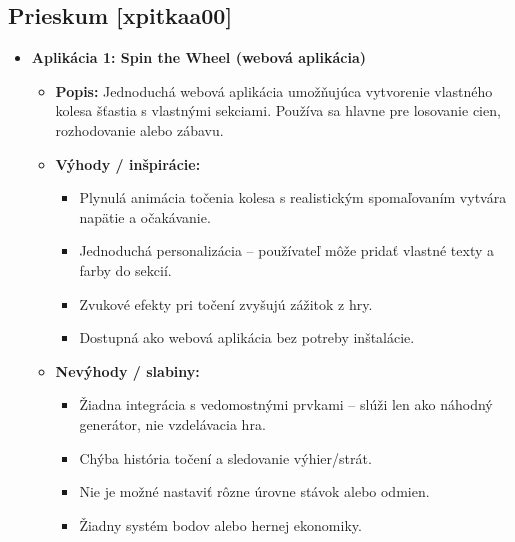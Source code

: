 \documentclass[a4paper,12pt]{article}
\begin{document}
    	
    	\subsection{Prieskum [xpitkaa00]}
    	\renewcommand{\labelitemi}{$\bullet$}
    	\renewcommand{\labelitemii}{$\bullet$}
    	\renewcommand{\labelitemiii}{$\bullet$}
    	\renewcommand{\labelitemiv}{$\bullet$}
    	\begin{itemize}
    		\item \textbf{Aplikácia 1: Spin the Wheel (webová aplikácia)}
    		      \begin{itemize}
    		      	\item \textbf{Popis:}  
    		      	      Jednoduchá webová aplikácia umožňujúca vytvorenie vlastného kolesa šťastia s vlastnými sekciami. Používa sa hlavne pre losovanie cien, rozhodovanie alebo zábavu.
    		      	\item \textbf{Výhody / inšpirácie:}
    		      	      \begin{itemize}
    		      	      	\item Plynulá animácia točenia kolesa s realistickým spomaľovaním vytvára napätie a očakávanie.
    		      	      	\item Jednoduchá personalizácia – používateľ môže pridať vlastné texty a farby do sekcií.
    		      	      	\item Zvukové efekty pri točení zvyšujú zážitok z hry.
    		      	      	\item Dostupná ako webová aplikácia bez potreby inštalácie.
    		      	      \end{itemize}
    		      	\item \textbf{Nevýhody / slabiny:}
    		      	      \begin{itemize}
    		      	      	\item Žiadna integrácia s vedomostnými prvkami – slúži len ako náhodný generátor, nie vzdelávacia hra.
    		      	      	\item Chýba história točení a sledovanie výhier/strát.
    		      	      	\item Nie je možné nastaviť rôzne úrovne stávok alebo odmien.
    		      	      	\item Žiadny systém bodov alebo hernej ekonomiky.
    		      	      \end{itemize}
    		      \end{itemize}
    		      

\end{itemize}
\end{document}
